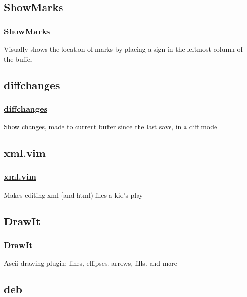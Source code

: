 \documentclass[14pt,svgnames,compress]{beamer}
\begin{document}
\subsection{ShowMarks}

\begin{frame}
    \frametitle{
        \href{https://github.com/vim-scripts/ShowMarks}
             {ShowMarks}
    }
    \large
    Visually shows the location of marks by placing a sign in the leftmost
    column of the buffer \\
\end{frame}


\subsection{diffchanges}

\begin{frame}
    \frametitle{
        \href{http://github.com/vim-scripts/diffchanges.vim}
             {diffchanges}
    }
    \large
    Show changes, made to current buffer since the last save, in a diff mode \\
\end{frame}


\subsection{xml.vim}

\begin{frame}
    \frametitle{
        \href{https://github.com/vim-scripts/xml.vim}
             {xml.vim}
    }
    \large
    Makes editing xml (and html) files a kid's play \\
\end{frame}


\subsection{DrawIt}

\begin{frame}
    \frametitle{
        \href{http://github.com/vim-scripts/DrawIt}
             {DrawIt}
    }
    \large
    Ascii drawing plugin: lines, ellipses, arrows, fills, and more \\
\end{frame}


\subsection{deb}
\end{document}
